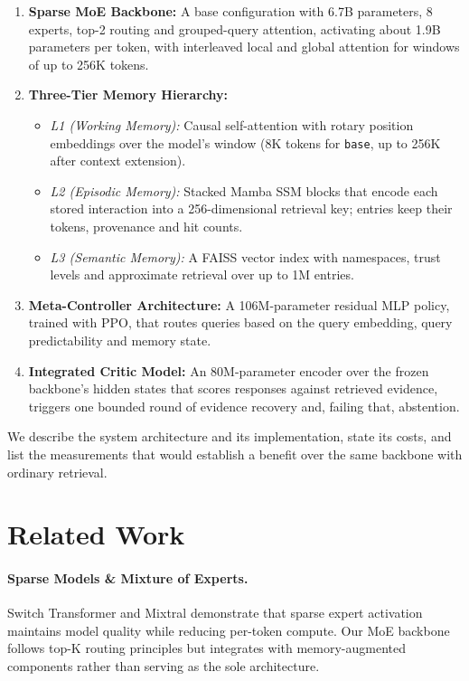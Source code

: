 \documentclass{article}
\begin{document}
\begin{enumerate}
    \item \textbf{Sparse MoE Backbone:} A base configuration with 6.7B parameters, 8 experts, top-2 routing and grouped-query attention, activating about 1.9B parameters per token, with interleaved local and global attention for windows of up to 256K tokens.
    \item \textbf{Three-Tier Memory Hierarchy:}
    \begin{itemize}
        \item \textit{L1 (Working Memory):} Causal self-attention with rotary position embeddings over the model's window (8K tokens for \texttt{base}, up to 256K after context extension).
        \item \textit{L2 (Episodic Memory):} Stacked Mamba SSM blocks that encode each stored interaction into a 256-dimensional retrieval key; entries keep their tokens, provenance and hit counts.
        \item \textit{L3 (Semantic Memory):} A FAISS vector index with namespaces, trust levels and approximate retrieval over up to 1M entries.
    \end{itemize}
    \item \textbf{Meta-Controller Architecture:} A 106M-parameter residual MLP policy, trained with PPO, that routes queries based on the query embedding, query predictability and memory state.
    \item \textbf{Integrated Critic Model:} An 80M-parameter encoder over the frozen backbone's hidden states that scores responses against retrieved evidence, triggers one bounded round of evidence recovery and, failing that, abstention.
\end{enumerate}

We describe the system architecture and its implementation, state its costs, and list the measurements that would establish a benefit over the same backbone with ordinary retrieval.

\section{Related Work}

\paragraph{Sparse Models \& Mixture of Experts.} Switch Transformer \cite{fedus2022switch} and Mixtral \cite{jiang2024mixtral} demonstrate that sparse expert activation maintains model quality while reducing per-token compute. Our MoE backbone follows top-K routing principles but integrates with memory-augmented components rather than serving as the sole architecture.
\end{document}
